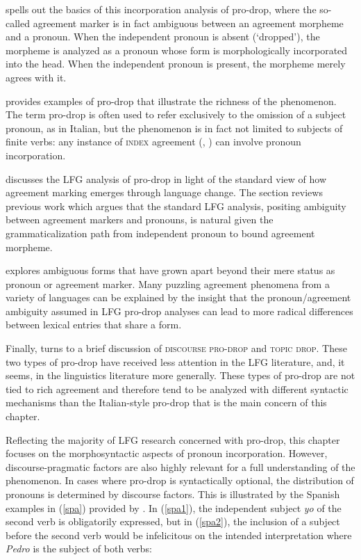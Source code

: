 \documentclass[output=paper,hidelinks]{langscibook}
\begin{document}
   spells out the basics of this  incorporation analysis of pro-drop, where the so-called agreement marker  is in fact ambiguous between an agreement morpheme and a  pronoun. When the independent pronoun is absent (`dropped'), the morpheme  is analyzed as a pronoun whose form is  morphologically incorporated into the head. When the independent pronoun is present, the morpheme merely agrees with it.

 provides examples of  pro-drop that illustrate the richness of the phenomenon.    The term pro-drop is    often used  to refer exclusively  to the omission of a  subject pronoun,  as in Italian,  but the  phenomenon is in fact not  limited to subjects of finite verbs:  any instance of  \textsc{index}  agreement    (, \citealt{WechslerZlatic:Agreement2003})   can involve pronoun incorporation. 
 
 
  discusses  the LFG analysis of pro-drop in light of the standard view of  how agreement marking emerges through language change.  The section reviews previous work which argues that the standard LFG analysis, positing ambiguity between agreement markers and pronouns, is natural given the   grammaticalization path from independent  pronoun to bound agreement morpheme. 

 explores ambiguous forms that have grown apart beyond their mere  status as pronoun or agreement marker. Many puzzling agreement phenomena  from a variety of languages can be explained by the insight that   the pronoun/agreement ambiguity assumed in LFG pro-drop analyses   can lead to  more radical differences between  lexical  entries that share a form. 

Finally,    turns to a brief discussion of \textsc{discourse pro-drop} and \textsc{topic drop}. These  two   types of pro-drop have received less attention in the LFG literature, and, it seems, in the linguistics literature more generally. These types of pro-drop  are not tied to   rich agreement and therefore   tend to be analyzed with  different syntactic mechanisms  than the Italian-style pro-drop that is the main concern of this chapter. 

 Reflecting the majority of LFG research concerned with pro-drop, this chapter focuses on the morphosyntactic aspects of pronoun incorporation.    However,  discourse-pragmatic factors are also  highly relevant for a full understanding of the phenomenon.   In cases where pro-drop is   syntactically optional,  the distribution of pronouns is determined by discourse factors.   This is illustrated by the  Spanish examples in (\ref{spa})  provided by  \citet{peskova13}.  In (\ref{spa1}), the independent subject \textit{yo} of the second verb  is obligatorily expressed, but in (\ref{spa2}),  the  inclusion of a subject before the second verb would be infelicitous on the intended interpretation where \textit{Pedro} is the subject of both verbs:
\end{document}
